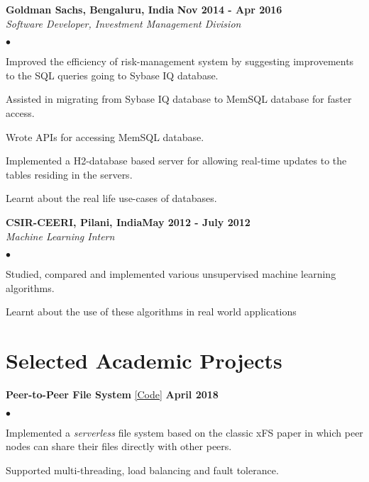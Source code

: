 \documentclass[margin,line]{res}
\newenvironment{list2}{
  \begin{list}{$\bullet$}{%
      \setlength{\itemsep}{0in}
      \setlength{\parsep}{0in} \setlength{\parskip}{0in}
      \setlength{\topsep}{0in} \setlength{\partopsep}{0in} 
      \setlength{\leftmargin}{0.2in}}}{\end{list}}
\begin{document}
\begin{resume}
{\bf Goldman Sachs, Bengaluru, India} \hfill {\bf Nov 2014 - Apr 2016}\\
{\em Software Developer, Investment Management Division}
\vspace{.3cm}
\begin{list2}
\item Improved the efficiency of risk-management system by suggesting improvements to the SQL
queries going to Sybase IQ database.
\item Assisted in migrating from Sybase IQ database to MemSQL database for faster access.
\item Wrote APIs for accessing MemSQL database.
\item Implemented a H2-database based server for allowing real-time updates to the tables residing in
the servers.
\item Learnt about the real life use-cases of databases.
\end{list2}

{\bf CSIR-CEERI, Pilani, India}\hfill {\bf May 2012 - July 2012}\\
{\em Machine Learning Intern}
\vspace{.3cm}
\begin{list2}
\item Studied, compared and implemented various unsupervised machine learning algorithms.
\item Learnt about the use of these algorithms in real world applications
\end{list2}

\section{\sc Selected Academic Projects}

{\bf Peer-to-Peer File System} \href{https://github.com/kudhru/P2PFileSystem}{\color{blue}[Code]} \hfill {\bf April 2018}\\

\vspace{-.3cm}
\begin{list2}
	\item Implemented a \emph{serverless} file system based on the classic xFS paper in which peer nodes can share their files directly with other peers.
	\item Supported multi-threading, load balancing and fault tolerance.
\end{list2}


\end{resume}
\end{document}
